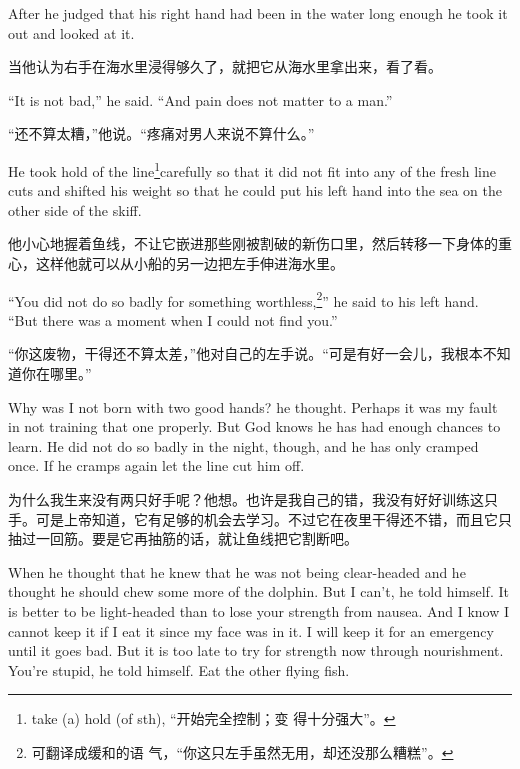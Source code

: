 \begin{paracol}{2}
\switchcolumn*

After he judged that his right hand had been in the water long enough he
took it out and looked at it.

\switchcolumn

当他认为右手在海水里浸得够久了，就把它从海水里拿出来，看了看。

\switchcolumn*

``It is not bad,'' he said. ``And pain does not matter to a man.''

\switchcolumn

“还不算太糟，”他说。“疼痛对男人来说不算什么。”

\switchcolumn*

He took hold of the line\footnote{take (a) hold (of sth), “开始完全控制；变
  得十分强大”。}carefully so that it did not fit into any of the fresh line
cuts and shifted his weight so that he could put his left hand into the sea
on the other side of the skiff.

\switchcolumn

他小心地握着鱼线，不让它嵌进那些刚被割破的新伤口里，然后转移一下身体的重心，这样他就可以从小船的另一边把左手伸进海水里。

\switchcolumn*

``You did not do so badly for something worthless,\footnote{可翻译成缓和的语
  气，“你这只左手虽然无用，却还没那么糟糕”。}'' he said to his left hand.
``But there was a moment when I could not find you.''

\switchcolumn

“你这废物，干得还不算太差，”他对自己的左手说。“可是有好一会儿，我根本不知道你在哪里。”

\switchcolumn*

Why was I not born with two good hands? he thought. Perhaps it was my fault
in not training that one properly. But God knows he has had enough chances
to learn. He did not do so badly in the night, though, and he has only
cramped once. If he cramps again let the line cut him off.

\switchcolumn

为什么我生来没有两只好手呢？他想。也许是我自己的错，我没有好好训练这只手。可是上帝知道，它有足够的机会去学习。不过它在夜里干得还不错，而且它只抽过一回筋。要是它再抽筋的话，就让鱼线把它割断吧。

\switchcolumn*

When he thought that he knew that he was not being \gls{clear-headed} and he
thought he should chew some more of the dolphin. But I can't, he told
himself. It is better to be \gls{light-headed} than to lose your strength from
\gls{nausea}. And I know I cannot keep it if I eat it since my face was in it. I
will keep it for an \gls{emergency} until it goes bad. But it is too late to try
for strength now through \gls{nourishment}. You're stupid, he told himself. Eat
the other flying fish.


\end{paracol}

